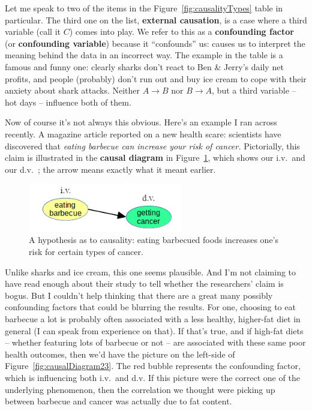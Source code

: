 
Let me speak to two of the items in the Figure~\ref{fig:causalityTypes} table
in particular. The third one on the list, \textbf{external causation}, is a
case where a third variable (call it $C$) comes into play. We refer to this as
a \textbf{confounding factor} (or \textbf{confounding variable}) because it
``confounds'' us: causes us to interpret the meaning behind the data in an
incorrect way. The example in the table is a famous and funny one: clearly
sharks don't react to Ben \& Jerry's daily net profits, and people (probably)
don't run out and buy ice cream to cope with their anxiety about shark attacks.
Neither $A \rightarrow B$ nor $B \rightarrow A$, but a third variable -- hot
days -- influence both of them.


Now of course it's not always this obvious. Here's an example I ran across
recently. A magazine article reported on a new health scare: scientists have
discovered that \textit{eating barbecue can increase your risk of cancer.}
Pictorially, this claim is illustrated in the \textbf{causal diagram} in
Figure~\ref{fig:causalDiagram}, which shows our i.v.~and our d.v.~; the arrow
means exactly what it meant earlier.

\begin{figure}[ht]
\centering
\includegraphics[width=0.6\textwidth]{causalDiagram.png}
\caption{A hypothesis as to causality: eating barbecued foods increases one's
risk for certain types of cancer.}
\label{fig:causalDiagram}
\end{figure}

Unlike sharks and ice cream, this one seems plausible. And I'm not claiming to
have read enough about their study to tell whether the researchers' claim is
bogus. But I couldn't help thinking that there are a great many possibly
confounding factors that could be blurring the results. For one, choosing to
eat barbecue a lot is probably often associated with a less healthy, higher-fat
diet in general (I can speak from experience on that). If that's true, and if
high-fat diets -- whether featuring lots of barbecue or not -- are associated
with these same poor health outcomes, then we'd have the picture on the
left-side of Figure~\ref{fig:causalDiagram23}. The red bubble represents the
confounding factor, which is influencing both i.v.~and d.v. If this picture
were the correct one of the underlying phenomenon, then the correlation we
thought were picking up between barbecue and cancer was actually due to fat
content.

